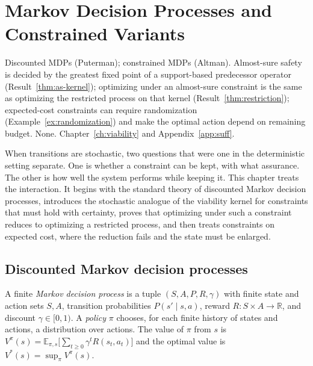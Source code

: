 \chapter{Markov Decision Processes and Constrained Variants}\label{ch:mdp}
{Discounted MDPs (Puterman); constrained MDPs (Altman).}
{Almost-sure safety is decided by the greatest fixed point of a support-based predecessor operator (Result~\ref{thm:as-kernel}); optimizing under an almost-sure constraint is the same as optimizing the restricted process on that kernel (Result~\ref{thm:restriction}); expected-cost constraints can require randomization (Example~\ref{ex:randomization}) and make the optimal action depend on remaining budget.}
{None.}
{Chapter~\ref{ch:viability} and Appendix~\ref{app:suff}.}

When transitions are stochastic, two questions that were one in the deterministic setting separate. One is whether a constraint can be kept, with what assurance. The other is how well the system performs while keeping it. This chapter treats the interaction. It begins with the standard theory of discounted Markov decision processes, introduces the stochastic analogue of the viability kernel for constraints that must hold with certainty, proves that optimizing under such a constraint reduces to optimizing a restricted process, and then treats constraints on expected cost, where the reduction fails and the state must be enlarged.

\section{Discounted Markov decision processes}

\begin{definition}[MDP]\label{def:mdp}
A finite \emph{Markov decision process} is a tuple $(S,A,P,R,\gamma)$ with finite state and action sets $S,A$, transition probabilities $P(s'\mid s,a)$, reward $R:S\times A\to\mathbb R$, and discount $\gamma\in[0,1)$. A \emph{policy} $\pi$ chooses, for each finite history of states and actions, a distribution over actions. The value of $\pi$ from $s$ is $V^{\pi}(s)=\mathbb E_{\pi,s}\bigl[\sum_{t\ge0}\gamma^{t}R(s_t,a_t)\bigr]$ and the optimal value is $V^{*}(s)=\sup_\pi V^{\pi}(s)$.
\end{definition}

